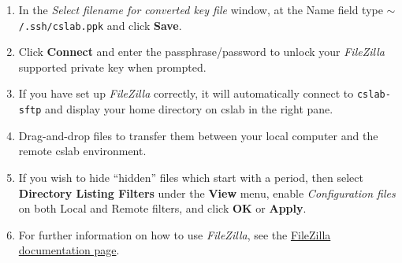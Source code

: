 \documentclass[12pt]{article}
\begin{document}
\begin{flushleft}
\begin{enumerate}
  \item In the \textit{Select filename for converted key file} window, at the Name field type \texttt{$\sim$/.ssh/cslab.ppk} and click \textbf{Save}.
  \item Click \textbf{Connect} and enter the passphrase/password to unlock your \textit{FileZilla} supported private key when prompted.
  \item If you have set up \textit{FileZilla} correctly, it will automatically connect to \texttt{cslab-sftp} and display your home directory on cslab in the right pane.
  \item Drag-and-drop files to transfer them between your local computer and the remote cslab environment.
  \item If you wish to hide ``hidden'' files which start with a period, then select \textbf{Directory Listing Filters} under the \textbf{View} menu, enable \textit{Configuration files} on both Local and Remote filters, and click \textbf{OK} or \textbf{Apply}.
  \item For further information on how to use \textit{FileZilla}, see the \href{https://wiki.filezilla-project.org/Documentation}{FileZilla documentation page}.
\end{enumerate}


\end{flushleft}
\end{document}
